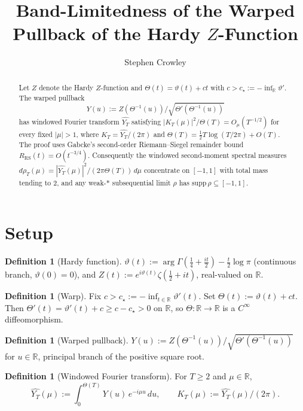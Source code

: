 \documentclass[11pt]{article}
\title{Band-Limitedness of the Warped Pullback of the Hardy $Z$-Function}
\author{Stephen Crowley}
\date{}
\theoremstyle{definition}
\newtheorem{definition}[theorem]{Definition}
\newcommand{\R}{\mathbb{R}}
\begin{document}
\maketitle

\begin{abstract}
Let $Z$ denote the Hardy $Z$-function and $\Theta(t) = \vartheta(t) + ct$ with $c > c_\star := -\inf_\R \vartheta'$. The warped pullback
\[
Y(u) := Z(\Theta^{-1}(u))/\sqrt{\Theta'(\Theta^{-1}(u))}
\]
has windowed Fourier transform $\widehat{Y_T}$ satisfying $|K_T(\mu)|^2/\Theta(T) = O_\mu(T^{-1/2})$ for every fixed $|\mu| > 1$, where $K_T = \widehat{Y_T}/(2\pi)$ and $\Theta(T) = \tfrac12 T\log(T/2\pi) + O(T)$. The proof uses Gabcke's second-order Riemann--Siegel remainder bound $R_{\mathrm{RS}}(t) = O(t^{-3/4})$. Consequently the windowed second-moment spectral measures $d\rho_T(\mu) = |\widehat{Y_T}(\mu)|^2/(2\pi\Theta(T))\,d\mu$ concentrate on $[-1,1]$ with total mass tending to $2$, and any weak-$*$ subsequential limit $\rho$ has $\mathrm{supp}\,\rho \subseteq [-1,1]$.
\end{abstract}

\section{Setup}

\begin{definition}[Hardy function]
$\vartheta(t) := \arg\Gamma(\tfrac14 + \tfrac{it}{2}) - \tfrac{t}{2}\log\pi$ (continuous branch, $\vartheta(0) = 0$), and $Z(t) := e^{i\vartheta(t)}\zeta(\tfrac12 + it)$, real-valued on $\R$.
\end{definition}

\begin{definition}[Warp]
Fix $c > c_\star := -\inf_{t \in \R}\vartheta'(t)$. Set $\Theta(t) := \vartheta(t) + ct$. Then $\Theta'(t) = \vartheta'(t) + c \geq c - c_\star > 0$ on $\R$, so $\Theta: \R \to \R$ is a $C^\infty$ diffeomorphism.
\end{definition}

\begin{definition}[Warped pullback]
$Y(u) := Z(\Theta^{-1}(u))/\sqrt{\Theta'(\Theta^{-1}(u))}$ for $u \in \R$, principal branch of the positive square root.
\end{definition}

\begin{definition}[Windowed Fourier transform]
For $T \geq 2$ and $\mu \in \R$,
\[
\widehat{Y_T}(\mu) := \int_0^{\Theta(T)} Y(u)\,e^{-i\mu u}\,du, \qquad K_T(\mu) := \widehat{Y_T}(\mu)/(2\pi).
\]
\end{definition}
\end{document}
